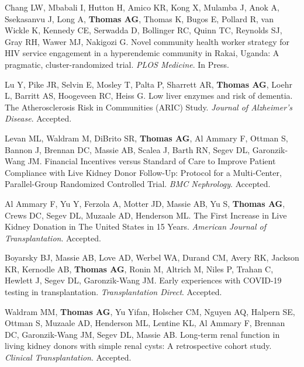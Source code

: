\documentclass[10pt]{article}
\makeatletter
\newlength{\bibhang}
\newlength{\bibsep}
 {\@listi \global\bibsep\itemsep \global\advance\bibsep by\parsep}
\newenvironment{bibenum*}
  {\renewcommand\labelenumi{[\theenumi]}%
   \etaremune[
     topsep=0pt,
     itemsep=\bibsep,
     parsep=0pt,partopsep=0pt,
     itemindent=-\bibhang,
     leftmargin={\bibhang+\widthof{[999]}}]}
  {\endetaremune}
\newcommand{\pmid}[1]{PMID:\href{https://www.ncbi.nlm.nih.gov/pubmed/#1}{#1}}
\makeatother
\begin{document}
\begin{bibenum*}

\item Chang LW, Mbabali I, Hutton H, Amico KR, Kong X, 
Mulamba J, Anok A, Ssekasanvu J, Long A, \textbf{Thomas AG},
Thomas K, Bugos E, Pollard R, van Wickle K, Kennedy CE,
Serwadda D, Bollinger RC, Quinn TC, Reynolds SJ, Gray RH,
Wawer MJ, Nakigozi G.
Novel community health worker strategy for HIV service 
engagement in a hyperendemic community in Rakai, Uganda: 
A pragmatic, cluster-randomized trial.
\emph{PLOS Medicine}. In Press.

\item Lu Y, Pike JR, Selvin E, Mosley T, Palta P, Sharrett AR, 
 \textbf{Thomas AG},
 Loehr L, Barritt AS, Hoogeveen RC, Heiss G. Low liver enzymes and 
 risk of dementia. The Atherosclerosis Risk in Communities (ARIC) Study.
  \emph{Journal of Alzheimer's Disease}. Accepted.

\item Levan ML, Waldram M,  DiBrito SR, \textbf{Thomas AG}, Al Ammary F,
  Ottman S, Bannon J, Brennan DC, Massie AB, Scalea J, Barth RN, Segev DL,
  Garonzik-Wang JM.
  Financial Incentives versus Standard of Care to Improve Patient Compliance
  with Live Kidney Donor Follow-Up: Protocol for a Multi-Center,
  Parallel-Group Randomized Controlled Trial.
  \emph{BMC Nephrology}. Accepted.

\item Al Ammary F, Yu Y, Ferzola A, Motter JD, Massie AB, Yu S,
  \textbf{Thomas AG}, Crews DC, Segev DL, Muzaale AD, Henderson ML.
  The First Increase in Live Kidney Donation in The United States
  in 15 Years.
  \emph{American Journal of Transplantation}. Accepted.

\item Boyarsky BJ, Massie AB, Love AD, Werbel WA, Durand CM, Avery RK,
  Jackson KR, Kernodle AB, \textbf{Thomas AG}, Ronin M,
  Altrich M, Niles P, Trahan C, Hewlett J, Segev DL, Garonzik-Wang JM.
  Early experiences with COVID-19 testing in transplantation.
  \emph{Transplantation Direct}. Accepted.

\item Waldram MM\dag, \textbf{Thomas AG\dag}, Yu Yifan, Holscher CM,
  Nguyen AQ, Halpern SE, Ottman S, Muzaale AD, Henderson ML, Lentine KL,
  Al Ammary F, Brennan DC, Garonzik-Wang JM, Segev DL, Massie AB.
  Long-term renal function in living kidney donors with simple renal cysts:
  A retrospective cohort study.
  \emph{Clinical Transplantation}. Accepted.


\end{bibenum*}
\end{document}
